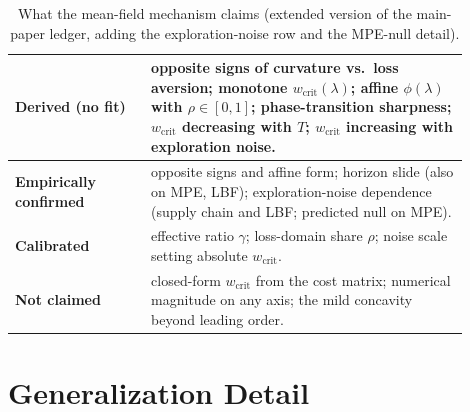 \documentclass[letterpaper]{article} %
\theoremstyle{plain}
\newcommand{\wcrit}{w_{\mathrm{crit}}}
\begin{document}
\begin{table}[t]
\centering
\caption{What the mean-field mechanism claims (extended version of the main-paper ledger,
adding the exploration-noise row and the MPE-null detail).}
\label{tab:ledger_full}
\small
\begin{tabular}{p{0.27\linewidth}p{0.63\linewidth}}
\toprule
\textbf{Derived (no fit)} & opposite signs of curvature vs.\ loss aversion; monotone
$\wcrit(\lambda)$; affine $\phi(\lambda)$ with $\rho\in[0,1]$; phase-transition sharpness;
$\wcrit$ decreasing with $T$; $\wcrit$ increasing with exploration noise. \\
\midrule
\textbf{Empirically confirmed} & opposite signs and affine form; horizon slide (also on MPE,
LBF); exploration-noise dependence (supply chain and LBF; predicted null on MPE). \\
\midrule
\textbf{Calibrated} & effective ratio $\gamma$; loss-domain share $\rho$; noise scale setting absolute $\wcrit$. \\
\midrule
\textbf{Not claimed} & closed-form $\wcrit$ from the cost matrix; numerical magnitude on any
axis; the mild concavity beyond leading order. \\
\bottomrule
\end{tabular}
\end{table}

\section{Generalization Detail}
\label{sec:s_generalization}
\end{document}
